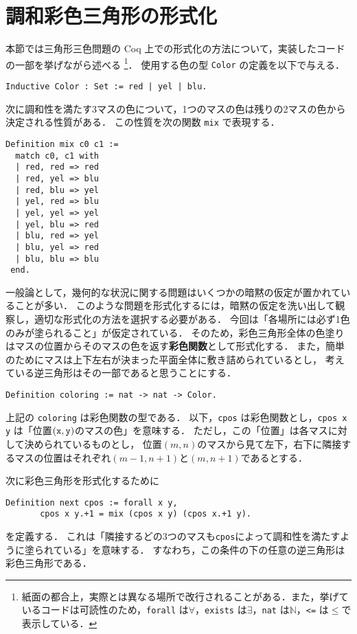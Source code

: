 \section{調和彩色三角形の形式化} \label{sec:dfn}

本節では三角形三色問題の Coq 上での形式化の方法について，実装したコードの一部を挙げながら述べる
\footnote{紙面の都合上，実際とは異なる場所で改行されることがある．また，挙げているコードは可読性のため，{\tt forall} は$\forall$，{\tt exists} は$\exists$，{\tt nat} は$\mathbb{N}$，{\tt <=} は$\leq$で表示している．}．
使用する色の型 {\tt Color} の定義を以下で与える．
\begin{lstlisting}[language=Coq]
 Inductive Color : Set := red | yel | blu.
\end{lstlisting}

次に調和性を満たす3マスの色について，1つのマスの色は残りの2マスの色から決定される性質がある．
この性質を次の関数 {\tt mix} で表現する．
\begin{lstlisting}[language=Coq]
 Definition mix c0 c1 :=
  match c0, c1 with
  | red, red => red
  | red, yel => blu
  | red, blu => yel
  | yel, red => blu
  | yel, yel => yel
  | yel, blu => red
  | blu, red => yel
  | blu, yel => red
  | blu, blu => blu
 end.
\end{lstlisting}

一般論として，幾何的な状況に関する問題はいくつかの暗黙の仮定が置かれていることが多い．
このような問題を形式化するには，暗黙の仮定を洗い出して観察し，適切な形式化の方法を選択する必要がある．
今回は「各場所には必ず1色のみが塗られること」が仮定されている．
そのため，彩色三角形全体の色塗りはマスの位置からそのマスの色を返す{\bf 彩色関数}として形式化する．
また，簡単のためにマスは上下左右が決まった平面全体に敷き詰められているとし，
考えている逆三角形はその一部であると思うことにする．
\begin{lstlisting}[language=Coq]
 Definition coloring := nat -> nat -> Color.
\end{lstlisting}
上記の {\tt coloring} は彩色関数の型である．
以下，{\tt cpos} は彩色関数とし，{\tt cpos x y} は「位置$({\tt x},{\tt y})$のマスの色」を意味する．
ただし，この「位置」は各マスに対して決められているものとし，
位置$(m,n)$のマスから見て左下，右下に隣接するマスの位置はそれぞれ$(m-1,n+1)$と$(m,n+1)$であるとする．

次に彩色三角形を形式化するために
\begin{lstlisting}[language=Coq]
 Definition next cpos := forall x y,
       cpos x y.+1 = mix (cpos x y) (cpos x.+1 y).
\end{lstlisting}
を定義する．
これは「隣接するどの3つのマスも{\tt cpos}によって調和性を満たすように塗られている」を意味する．
すなわち，この条件の下の任意の逆三角形は彩色三角形である．

